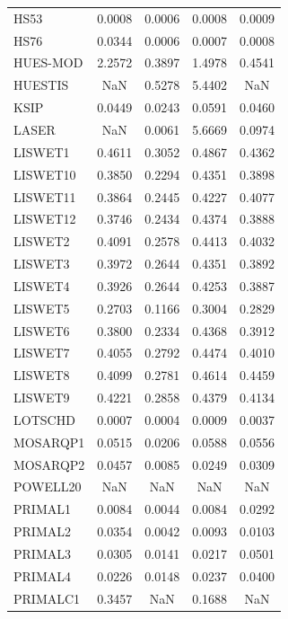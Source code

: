 \begin{longtable}{lcccc}
HS53     &   0.0008 &   0.0006 &     0.0008 &   0.0009 \\
HS76     &   0.0344 &   0.0006 &     0.0007 &   0.0008 \\
HUES-MOD &   2.2572 &   0.3897 &     1.4978 &   0.4541 \\
HUESTIS  &      NaN &   0.5278 &     5.4402 &      NaN \\
KSIP     &   0.0449 &   0.0243 &     0.0591 &   0.0460 \\
LASER    &      NaN &   0.0061 &     5.6669 &   0.0974 \\
LISWET1  &   0.4611 &   0.3052 &     0.4867 &   0.4362 \\
LISWET10 &   0.3850 &   0.2294 &     0.4351 &   0.3898 \\
LISWET11 &   0.3864 &   0.2445 &     0.4227 &   0.4077 \\
LISWET12 &   0.3746 &   0.2434 &     0.4374 &   0.3888 \\
LISWET2  &   0.4091 &   0.2578 &     0.4413 &   0.4032 \\
LISWET3  &   0.3972 &   0.2644 &     0.4351 &   0.3892 \\
LISWET4  &   0.3926 &   0.2644 &     0.4253 &   0.3887 \\
LISWET5  &   0.2703 &   0.1166 &     0.3004 &   0.2829 \\
LISWET6  &   0.3800 &   0.2334 &     0.4368 &   0.3912 \\
LISWET7  &   0.4055 &   0.2792 &     0.4474 &   0.4010 \\
LISWET8  &   0.4099 &   0.2781 &     0.4614 &   0.4459 \\
LISWET9  &   0.4221 &   0.2858 &     0.4379 &   0.4134 \\
LOTSCHD  &   0.0007 &   0.0004 &     0.0009 &   0.0037 \\
MOSARQP1 &   0.0515 &   0.0206 &     0.0588 &   0.0556 \\
MOSARQP2 &   0.0457 &   0.0085 &     0.0249 &   0.0309 \\
POWELL20 &      NaN &      NaN &        NaN &      NaN \\
PRIMAL1  &   0.0084 &   0.0044 &     0.0084 &   0.0292 \\
PRIMAL2  &   0.0354 &   0.0042 &     0.0093 &   0.0103 \\
PRIMAL3  &   0.0305 &   0.0141 &     0.0217 &   0.0501 \\
PRIMAL4  &   0.0226 &   0.0148 &     0.0237 &   0.0400 \\
PRIMALC1 &   0.3457 &      NaN &     0.1688 &      NaN \\

\end{longtable}
